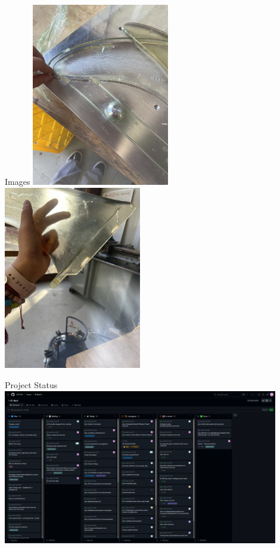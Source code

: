 \begin{frame}{Images}
    \includegraphics[height=0.45\textheight,width=0.45\textwidth,keepaspectratio]{images/sf_img_7576.jpg}
    \includegraphics[height=0.45\textheight,width=0.45\textwidth,keepaspectratio]{images/sf_img_7577.jpg}
\end{frame}

\begin{frame}{Project Status}
    \centering
    \includegraphics[height=0.9\textheight,width=0.9\textwidth,keepaspectratio]{images/sf_project_status.png}
\end{frame}

